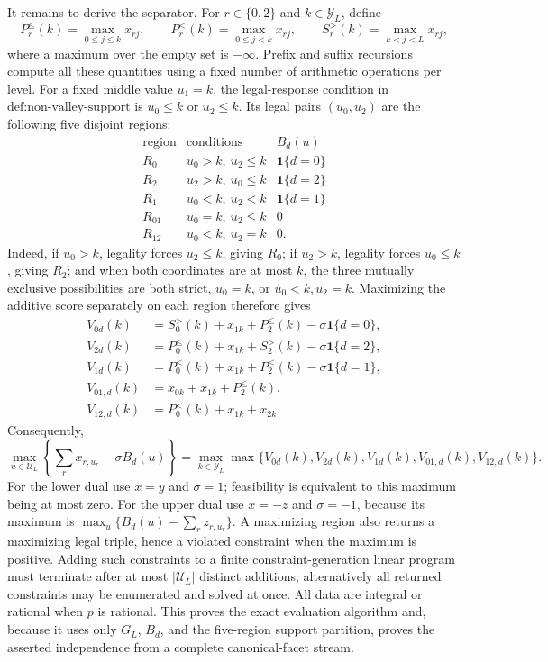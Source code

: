 It remains to derive the separator.  For \(r\in\{0,2\}\) and \(k\in\mathcal Y_L\), define
\[
 P_r^{\le}(k)=\max_{0\le j\le k}x_{rj},\qquad
 P_r^{<}(k)=\max_{0\le j<k}x_{rj},\qquad
 S_r^{>}(k)=\max_{k<j<L}x_{rj},
\]
where a maximum over the empty set is \(-\infty\).  Prefix and suffix recursions compute all these quantities using a fixed number of arithmetic operations per level.  For a fixed middle value \(u_1=k\), the legal-response condition in \(\text{def:non-valley-support}\) is \(u_0\le k\) or \(u_2\le k\).  Its legal pairs \((u_0,u_2)\) are the following five disjoint regions:
\[
\begin{array}{c|c|c}
\text{region}&\text{conditions}&B_d(u)\\ \hline
R_0&u_0>k,\ u_2\le k&\mathbf 1\{d=0\}\\
R_2&u_2>k,\ u_0\le k&\mathbf 1\{d=2\}\\
R_1&u_0<k,\ u_2<k&\mathbf 1\{d=1\}\\
R_{01}&u_0=k,\ u_2\le k&0\\
R_{12}&u_0<k,\ u_2=k&0.
\end{array}
\]
Indeed, if \(u_0>k\), legality forces \(u_2\le k\), giving \(R_0\); if \(u_2>k\), legality forces \(u_0\le k\), giving \(R_2\); and when both coordinates are at most \(k\), the three mutually exclusive possibilities are both strict, \(u_0=k\), or \(u_0<k,u_2=k\).  Maximizing the additive score separately on each region therefore gives
\[
\begin{aligned}
 V_{0d}(k)&=S_0^{>}(k)+x_{1k}+P_2^{\le}(k)-\sigma\mathbf 1\{d=0\},\\
 V_{2d}(k)&=P_0^{\le}(k)+x_{1k}+S_2^{>}(k)-\sigma\mathbf 1\{d=2\},\\
 V_{1d}(k)&=P_0^{<}(k)+x_{1k}+P_2^{<}(k)-\sigma\mathbf 1\{d=1\},\\
 V_{01,d}(k)&=x_{0k}+x_{1k}+P_2^{\le}(k),\\
 V_{12,d}(k)&=P_0^{<}(k)+x_{1k}+x_{2k}.
\end{aligned}
\]
Consequently,
\[
 \max_{u\in\mathcal U_L}\left\{\sum_rx_{r,u_r}-\sigma B_d(u)\right\}
 =\max_{k\in\mathcal Y_L}\max\{V_{0d}(k),V_{2d}(k),V_{1d}(k),V_{01,d}(k),V_{12,d}(k)\}.
\]
For the lower dual use \(x=y\) and \(\sigma=1\); feasibility is equivalent to this maximum being at most zero.  For the upper dual use \(x=-z\) and \(\sigma=-1\), because its maximum is \(\max_u\{B_d(u)-\sum_rz_{r,u_r}\}\).  A maximizing region also returns a maximizing legal triple, hence a violated constraint when the maximum is positive.  Adding such constraints to a finite constraint-generation linear program must terminate after at most \(|\mathcal U_L|\) distinct additions; alternatively all returned constraints may be enumerated and solved at once.  All data are integral or rational when \(p\) is rational.  This proves the exact evaluation algorithm and, because it uses only \(G_L\), \(B_d\), and the five-region support partition, proves the asserted independence from a complete canonical-facet stream.
